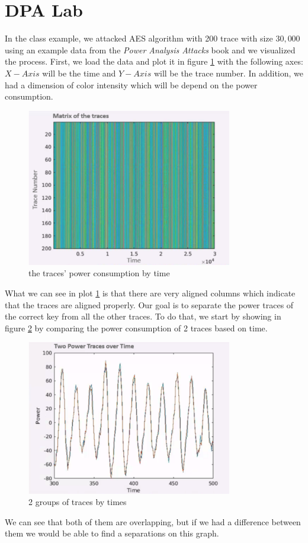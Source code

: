 \section{DPA Lab}
In the class example, we attacked AES algorithm with 200 trace with size $30,000$ using an example data from the \textit{Power Analysis Attacks} book and we visualized the process.
First, we load the data and plot it in figure \ref{fig:traceByTime} with the following axes: $X-Axis$ will be the time and $Y-Axis$ will be the trace number. In addition, we had a dimension of color intensity which will be depend on the power consumption.
\begin{figure}[H]
\centering
\includegraphics[width=0.8\textwidth]{images/Lecture6/traceByTime.png}
\caption{the traces' power consumption by time}
\label{fig:traceByTime}
\end{figure}
What we can see in plot \ref{fig:traceByTime} is that there are very aligned columns which indicate that the traces are aligned properly.
Our goal is to separate the power traces of the correct key from all the other traces. To do that, we start by showing in figure \ref{fig:2traces-by-time} by comparing the power consumption of 2 traces based on time.
\begin{figure}[H]
\centering
\includegraphics[width=0.8\textwidth]{images/Lecture6/2traces-by-time.png}
\caption{2 groups of traces by times}
\label{fig:2traces-by-time}
\end{figure}
We can see that both of them are overlapping, but if we had a difference between them we would be able to find a separations on this graph.

